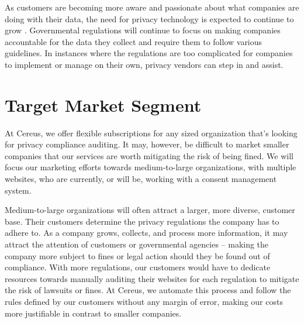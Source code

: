 As customers are becoming more aware and passionate about what companies are doing with their data, the need for privacy technology is expected to continue to grow \cite{meehan.forbes.2019}. Governmental regulations will continue to focus on making companies accountable for the data they collect and require them to follow various guidelines. In instances where the regulations are too complicated for companies to implement or manage on their own, privacy vendors can step in and assist.

\section{Target Market Segment}

At Cereus, we offer flexible subscriptions for any sized organization that's looking for privacy compliance auditing. It may, however, be difficult to market smaller companies that our services are worth mitigating the risk of being fined. We will focus our marketing efforts towards medium-to-large organizations, with multiple websites, who are currently, or will be, working with a consent management system. 

Medium-to-large organizations will often attract a larger, more diverse, customer base. Their customers determine the privacy regulations the company has to adhere to. As a company grows, collects, and process more information, it may attract the attention of customers or governmental agencies -- making the company more subject to fines or legal action should they be found out of compliance. With more regulations, our customers would have to dedicate resources towards manually auditing their websites for each regulation to mitigate the risk of lawsuits or fines. At Cereus, we automate this process and follow the rules defined by our customers without any margin of error, making our costs more justifiable in contrast to smaller companies.


